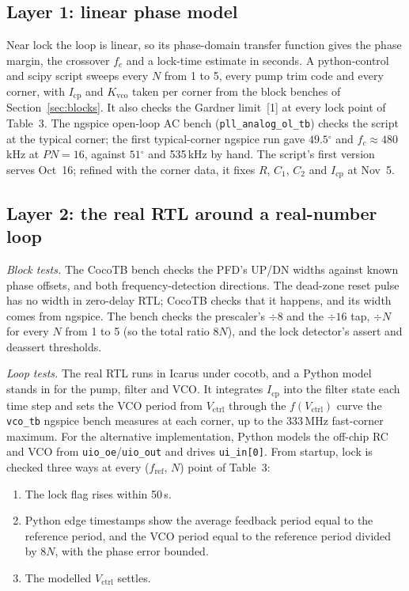 \documentclass[11pt]{article}
\newcommand{\pin}[1]{\texttt{#1}}              %
\newcommand{\MHz}{\,MHz}
\newcommand{\kHz}{\,kHz}
\newcommand{\us}{\,\textmu s}
\newcommand{\dg}{\ensuremath{^\circ}}
\newcommand{\icp}{I_\mathrm{cp}}
\newcommand{\kvco}{K_\mathrm{vco}}
\newcommand{\fref}{f_\mathrm{ref}}
\newcommand{\vctrl}{V_\mathrm{ctrl}}
\begin{document}
\subsection{Layer 1: linear phase model}
Near lock the loop is linear, so its phase-domain transfer function gives the phase margin, the crossover $f_c$ and a lock-time estimate in seconds. A python-control and scipy script sweeps every $N$ from 1 to 5, every pump trim code and every corner, with $\icp$ and $\kvco$ taken per corner from the block benches of Section~\ref{sec:blocks}. It also checks the Gardner limit~[1] at every lock point of Table~3. The ngspice open-loop AC bench (\pin{pll\_analog\_ol\_tb}) checks the script at the typical corner; the first typical-corner ngspice run gave $49.5\dg$ and $f_c \approx 480$\kHz{} at $PN = 16$, against $51\dg$ and 535\kHz{} by hand. The script's first version serves Oct~16; refined with the corner data, it fixes $R$, $C_1$, $C_2$ and $\icp$ at Nov~5.

\subsection{Layer 2: the real RTL around a real-number loop}
\emph{Block tests.} The CocoTB bench checks the PFD's UP/DN widths against known phase offsets, and both frequency-detection directions. The dead-zone reset pulse has no width in zero-delay RTL; CocoTB checks that it happens, and its width comes from ngspice. The bench checks the prescaler's $\div 8$ and the $\div 16$ tap, $\div N$ for every $N$ from 1 to 5 (so the total ratio $8N$), and the lock detector's assert and deassert thresholds.

\emph{Loop tests.} The real RTL runs in Icarus under cocotb, and a Python model stands in for the pump, filter and VCO. It integrates $\icp$ into the filter state each time step and sets the VCO period from $\vctrl$ through the $f(\vctrl)$ curve the \pin{vco\_tb} ngspice bench measures at each corner, up to the 333\MHz{} fast-corner maximum. For the alternative implementation, Python models the off-chip RC and VCO from \pin{uio\_oe}/\pin{uio\_out} and drives \pin{ui\_in[0]}. From startup, lock is checked three ways at every ($\fref$, $N$) point of Table~3:

\begin{enumerate}[leftmargin=18pt,itemsep=2pt,topsep=4pt]
\item The lock flag rises within 50\us.
\item Python edge timestamps show the average feedback period equal to the reference period, and the VCO period equal to the reference period divided by $8N$, with the phase error bounded.
\item The modelled $\vctrl$ settles.
\end{enumerate}
\end{document}
